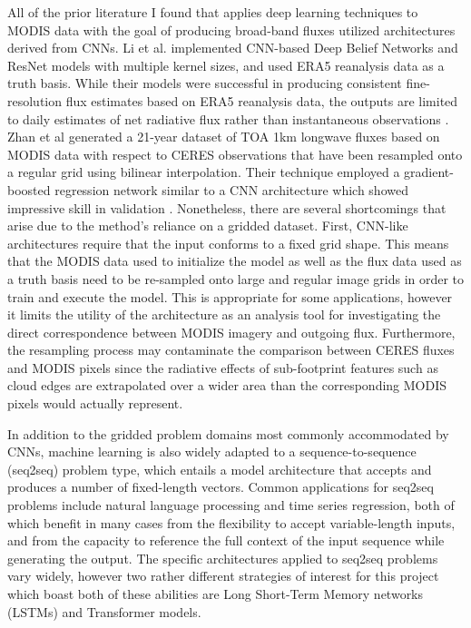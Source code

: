 \documentclass[12pt]{article}
\begin{document}
All of the prior literature I found that applies deep learning techniques to MODIS data with the goal of producing broad-band fluxes utilized architectures derived from CNNs. Li et al. implemented CNN-based Deep Belief Networks and ResNet models with multiple kernel sizes, and used ERA5 reanalysis data as a truth basis. While their models were successful in producing consistent fine-resolution flux estimates based on ERA5 reanalysis data, the outputs are limited to daily estimates of net radiative flux rather than instantaneous observations \cite{li_evaluation_2022}. Zhan et al generated a 21-year dataset of TOA 1km longwave fluxes based on MODIS data with respect to CERES observations that have been resampled onto a regular grid using bilinear interpolation. Their technique employed a gradient-boosted regression network similar to a CNN architecture which showed impressive skill in validation \cite{zhan_generation_2023}. Nonetheless, there are several shortcomings that arise due to the method's reliance on a gridded dataset. First, CNN-like architectures require that the input conforms to a fixed grid shape. This means that the MODIS data used to initialize the model as well as the flux data used as a truth basis need to be re-sampled onto large and regular image grids in order to train and execute the model. This is appropriate for some applications, however it limits the utility of the architecture as an analysis tool for investigating the direct correspondence between MODIS imagery and outgoing flux. Furthermore, the resampling process may contaminate the comparison between CERES fluxes and MODIS pixels since the radiative effects of sub-footprint features such as cloud edges are extrapolated over a wider area than the corresponding MODIS pixels would actually represent.

In addition to the gridded problem domains most commonly accommodated by CNNs, machine learning is also widely adapted to a sequence-to-sequence (seq2seq) problem type, which entails a model architecture that accepts and produces a number of fixed-length vectors. Common applications for seq2seq problems include natural language processing and time series regression, both of which benefit in many cases from the flexibility to accept variable-length inputs, and from the capacity to reference the full context of the input sequence while generating the output. The specific architectures applied to seq2seq problems vary widely, however two rather different strategies of interest for this project which boast both of these abilities are Long Short-Term Memory networks (LSTMs) and Transformer models.
\end{document}
